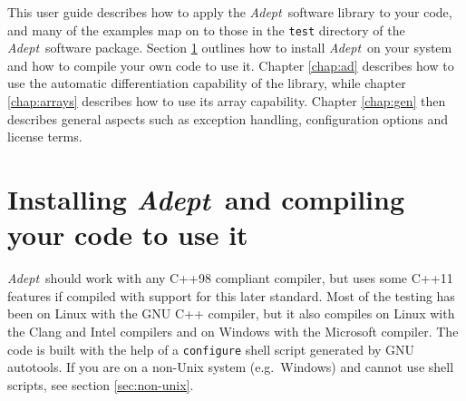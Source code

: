 \documentclass[a4,oneside]{book}
\def\codesize{\small}
\def\Adept{\emph{Adept}}
\def\code#1{{\codesize\texttt{#1}}}
\begin{document}
This user guide describes how to apply the \Adept\ software library to
your code, and many of the examples map on to those in the \code{test}
directory of the \Adept\ software package.  Section
\ref{sec:installing} outlines how to install \Adept\ on your system
and how to compile your own code to use it. Chapter \ref{chap:ad}
describes how to use the automatic differentiation capability of the
library, while chapter \ref{chap:arrays} describes how to use its
array capability. Chapter \ref{chap:gen} then describes general
aspects such as exception handling, configuration options and license
terms.

\section{Installing \Adept\ and compiling your code to use it}
\label{sec:installing}
\Adept\ should work with any C++98 compliant compiler, but uses some
C++11 features if compiled with support for this later standard. Most
of the testing has been on Linux with the GNU C++ compiler, but it
also compiles on Linux with the Clang and Intel compilers and on
Windows with the Microsoft compiler. The code is built with the help
of a \code{configure} shell script generated by GNU autotools.  If you
are on a non-Unix system (e.g.\ Windows) and cannot use shell scripts,
see section \ref{sec:non-unix}.
\end{document}
